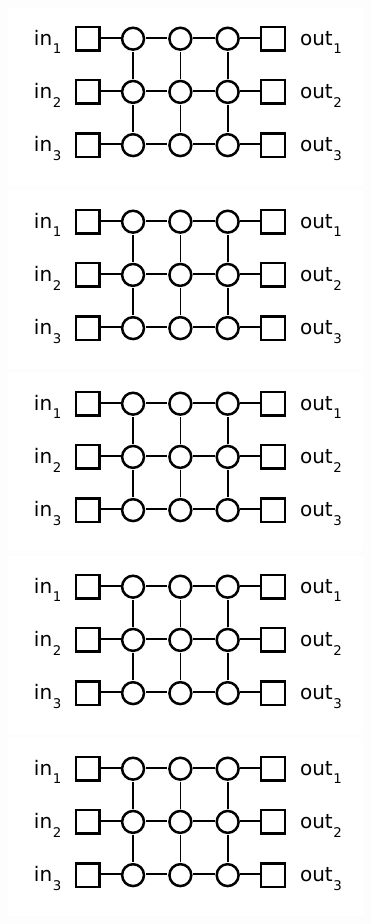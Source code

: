 \documentclass[12pt,oneside]{article}
\begin{document}
\begin{problem}{18}
{}

\newpage
\begin{figure}[h!]
\begin{center}
    \includegraphics{3x3grid.pdf} \quad
    \includegraphics{3x3grid.pdf} \quad \\[1.5em]
    \includegraphics{3x3grid.pdf} \quad
    \includegraphics{3x3grid.pdf} \quad \\[1.5em]
    \includegraphics{3x3grid.pdf} \quad

\end{center}
\end{figure}
\end{problem}
\end{document}
